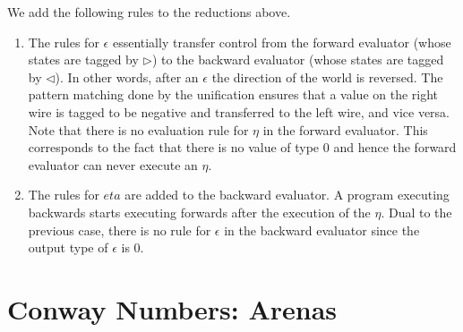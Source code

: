 \documentclass[authoryear,preprint]{sigplanconf}
\begin{document}
We add the following rules to the reductions above. 
\begin{enumerate}
\item The rules for $\epsilon$ essentially transfer control from the forward
  evaluator (whose states are tagged by $\triangleright$) to the backward
  evaluator (whose states are tagged by $\triangleleft$). In other words,
  after an $\epsilon$ the direction of the world is reversed. The pattern
  matching done by the unification ensures that a value on the right wire is
  tagged to be negative and transferred to the left wire, and vice versa.
  Note that there is no evaluation rule for $\eta$ in the forward
  evaluator. This corresponds to the fact that there is no value of type 0
  and hence the forward evaluator can never execute an $\eta$.

\item The rules for $eta$ are added to the backward evaluator. A program
  executing backwards starts executing forwards after the execution of the
  $\eta$. Dual to the previous case, there is no rule for $\epsilon$ in the
  backward evaluator since the output type of $\epsilon$ is 0.
\end{enumerate}

\section{Conway Numbers: Arenas}
\end{document}
